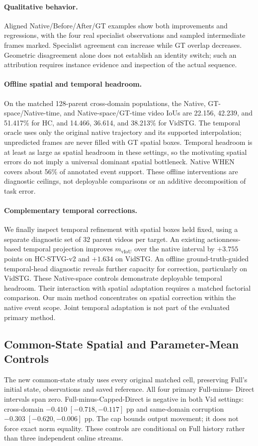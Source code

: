 \documentclass[10pt,twocolumn,letterpaper]{article}
\newcommand{\mvIoU}{\ensuremath{m_{\mathrm{vIoU}}}}
\begin{document}
\paragraph{Qualitative behavior.}
Aligned Native/Before/After/GT examples show both improvements and
regressions, with the four real specialist observations and sampled
intermediate frames marked. Specialist agreement can increase while
GT overlap decreases. Geometric disagreement alone does not establish
an identity switch; such an attribution requires instance evidence
and inspection of the actual sequence.

\paragraph{Offline spatial and temporal headroom.}
On the matched 128-parent cross-domain populations, the Native,
GT-space/Native-time, and Native-space/GT-time video IoUs are
22.156, 42.239, and 51.417\% for HC, and 14.466, 36.614,
and 38.213\% for VidSTG. The temporal oracle uses only the
original native trajectory and its supported interpolation;
unpredicted frames are never filled with GT spatial boxes.
Temporal headroom is at least as large as spatial headroom in
these settings, so the motivating spatial errors do not imply a
universal dominant spatial bottleneck. Native WHEN covers about
56\% of annotated event support. These offline interventions are
diagnostic ceilings, not deployable comparisons or an additive
decomposition of task error.

\paragraph{Complementary temporal corrections.}
We finally inspect temporal refinement with spatial boxes
held fixed, using a separate diagnostic set of 32 parent
videos per target. An existing actionness-based temporal
projection improves \mvIoU{} over the native interval by
$+3.755$ points on HC-STVG-v2 and $+1.634$ on VidSTG.
An offline ground-truth-guided temporal-head diagnostic
reveals further capacity for correction, particularly
on VidSTG. These Native-space controls demonstrate deployable temporal headroom.
Their interaction with spatial adaptation requires a matched factorial comparison.
Our main method concentrates on spatial correction
within the native event scope. Joint temporal adaptation is not
part of the evaluated primary method.


	
	
\subsection{Common-State Spatial and Parameter-Mean Controls}
The new common-state study uses every original matched cell, preserving Full's
initial state, observations and saved reference. All four primary Full-minus-
Direct intervals span zero. Full-minus-Capped-Direct is negative in both Vid
settings: cross-domain $-0.410\;[-0.718,-0.117]$ pp and same-domain corruption
$-0.303\;[-0.620,-0.006]$ pp. The cap bounds output movement; it does not force
exact norm equality. These controls are conditional on Full history rather
than three independent online streams.
\end{document}
